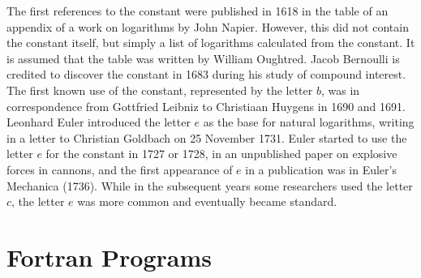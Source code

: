 \documentclass[11pt]{article}
\begin{document}
The first references to the constant were published in 1618 in the table of an appendix of a work on logarithms by John Napier. However, this did not contain the constant itself, but simply a list of logarithms calculated from the constant. It is assumed that the table was written by William Oughtred. Jacob Bernoulli is credited to discover the constant in 1683 during his study of compound interest. The first known use of the constant, represented by the letter $b$, was in correspondence from Gottfried Leibniz to Christiaan Huygens in 1690 and 1691. Leonhard Euler introduced the letter $e$ as the base for natural logarithms, writing in a letter to Christian Goldbach on 25 November 1731. Euler started to use the letter $e$ for the constant in 1727 or 1728, in an unpublished paper on explosive forces in cannons, and the first appearance of $e$ in a publication was in Euler's Mechanica (1736). While in the subsequent years some researchers used the letter $c$, the letter $e$ was more common and eventually became standard.

\section{Fortran Programs}
\end{document}
